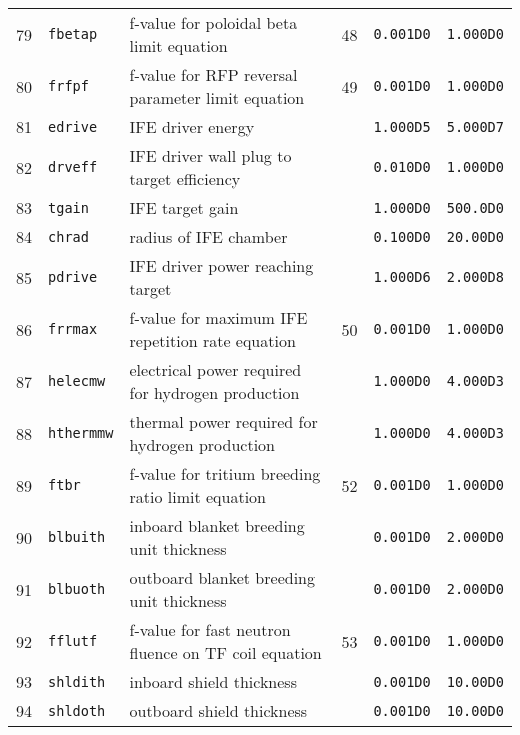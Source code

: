 \documentclass[11pt,a4paper]{report}
\begin{document}
\begin{table}[tbph]
\begin{center}
\begin{tabular}{||c|l|l|c|c|c||}
79  & \texttt{fbetap}   & f-value for poloidal beta limit equation                & 48  & \texttt{0.001D0} & \texttt{1.000D0} \\
80  & \texttt{frfpf}    & f-value for RFP reversal parameter limit equation       & 49  & \texttt{0.001D0} & \texttt{1.000D0} \\
81  & \texttt{edrive}   & IFE driver energy                                       &     & \texttt{1.000D5} & \texttt{5.000D7} \\
82  & \texttt{drveff}   & IFE driver wall plug to target efficiency               &     & \texttt{0.010D0} & \texttt{1.000D0} \\
83  & \texttt{tgain}    & IFE target gain                                         &     & \texttt{1.000D0} & \texttt{500.0D0} \\
84  & \texttt{chrad}    & radius of IFE chamber                                   &     & \texttt{0.100D0} & \texttt{20.00D0} \\
85  & \texttt{pdrive}   & IFE driver power reaching target                        &     & \texttt{1.000D6} & \texttt{2.000D8} \\
86  & \texttt{frrmax}   & f-value for maximum IFE repetition rate equation        & 50  & \texttt{0.001D0} & \texttt{1.000D0} \\
87  & \texttt{helecmw}  & electrical power required for hydrogen production       &     & \texttt{1.000D0} & \texttt{4.000D3} \\
88  & \texttt{hthermmw} & thermal power required for hydrogen production          &     & \texttt{1.000D0} & \texttt{4.000D3} \\
89  & \texttt{ftbr}     & f-value for tritium breeding ratio limit equation       & 52  & \texttt{0.001D0} & \texttt{1.000D0} \\
90  & \texttt{blbuith}  & inboard blanket breeding unit thickness                 &     & \texttt{0.001D0} & \texttt{2.000D0} \\
91  & \texttt{blbuoth}  & outboard blanket breeding unit thickness                &     & \texttt{0.001D0} & \texttt{2.000D0} \\
92  & \texttt{fflutf}   & f-value for fast neutron fluence on TF coil equation    & 53  & \texttt{0.001D0} & \texttt{1.000D0} \\
93  & \texttt{shldith}  & inboard shield thickness                                &     & \texttt{0.001D0} & \texttt{10.00D0} \\
94  & \texttt{shldoth}  & outboard shield thickness                               &     & \texttt{0.001D0} & \texttt{10.00D0} \\

\end{tabular}
\end{center}
\end{table}
\end{document}
